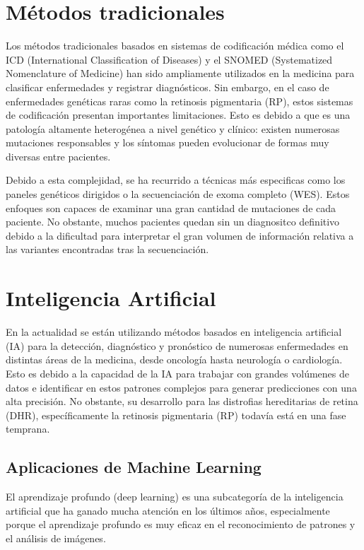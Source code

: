 \documentclass[11pt,spanish,listoffigures,listoftables]{tfgetsinf}
\begin{document}
\section{Métodos tradicionales}

Los métodos tradicionales basados en sistemas de codificación médica como el ICD (International Classification of Diseases) y el SNOMED (Systematized Nomenclature of Medicine) han sido ampliamente utilizados en la medicina para clasificar enfermedades y registrar diagnósticos. Sin embargo, en el caso de enfermedades genéticas raras como la retinosis pigmentaria (RP), estos sistemas de codificación presentan importantes limitaciones\cite{VER}. Esto es debido a que es una patología altamente heterogénea a nivel genético y clínico: existen numerosas mutaciones responsables y los síntomas pueden evolucionar de formas muy diversas entre pacientes\cite{HAR}. 

Debido a esta complejidad, se ha recurrido a técnicas más especificas como los paneles genéticos dirigidos o la secuenciación de exoma completo (WES). Estos enfoques son capaces de examinar una gran cantidad de mutaciones de cada paciente. No obstante, muchos pacientes quedan sin un diagnositco definitivo debido a la dificultad para interpretar el gran volumen de información relativa a las variantes encontradas tras la secuenciación.

\section{Inteligencia Artificial}

En la actualidad se están utilizando métodos basados en inteligencia artificial (IA) para la detección, diagnóstico y pronóstico de numerosas enfermedades en distintas áreas de la medicina, desde oncología hasta neurología o cardiología. Esto es debido a la capacidad de la IA para trabajar con grandes volúmenes de datos e identificar en estos patrones complejos para generar predicciones con una alta precisión\cite{FER}. No obstante, su desarrollo para las distrofias hereditarias de retina (DHR), específicamente la retinosis pigmentaria (RP) todavía está en una fase temprana.

\subsection{Aplicaciones de Machine Learning}

El aprendizaje profundo (deep learning) es una subcategoría de la inteligencia artificial que ha ganado mucha atención en los últimos años, especialmente porque el aprendizaje profundo es muy eficaz en el reconocimiento de patrones y el análisis de imágenes\cite{STE}.
\end{document}
